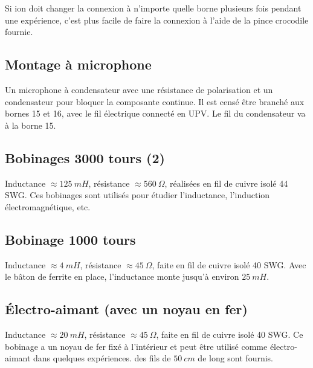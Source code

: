 \documentclass{book}
\begin{document}
Si ion doit changer la connexion à n'importe quelle borne plusieurs fois pendant une expérience, c'est plus facile de faire la connexion à l'aide de la pince crocodile fournie.




\subsection{Montage à microphone}





Un microphone à condensateur avec une résistance de polarisation et un condensateur pour bloquer la composante continue. Il est censé être branché aux bornes 15 et 16, avec le fil électrique connecté en UPV. Le fil du condensateur va à la borne 15.




\subsection{Bobinages 3000 tours (2)}





Inductance $\approx  125\ mH$, résistance $\approx  560\ \Omega$, réalisées en fil de cuivre isolé 44 SWG. Ces bobinages sont utilisés pour étudier l'inductance, l'induction électromagnétique, etc.




\subsection{Bobinage 1000 tours}





Inductance $\approx  4\ mH$, résistance $\approx  45\ \Omega$, faite en fil de cuivre isolé 40 SWG. Avec le bâton de ferrite en place, l'inductance monte jusqu'à environ $25\ mH$.




\subsection{Électro-aimant (avec un noyau en fer)}





Inductance $\approx  20\ mH$, résistance $\approx  45\ \Omega$, faite en fil de cuivre isolé 40 SWG. Ce bobinage a un noyau de fer fixé à l'intérieur et peut être utilisé comme électro-aimant dans quelques expériences. des fils de $50\ cm$ de long sont fournis.
\end{document}
